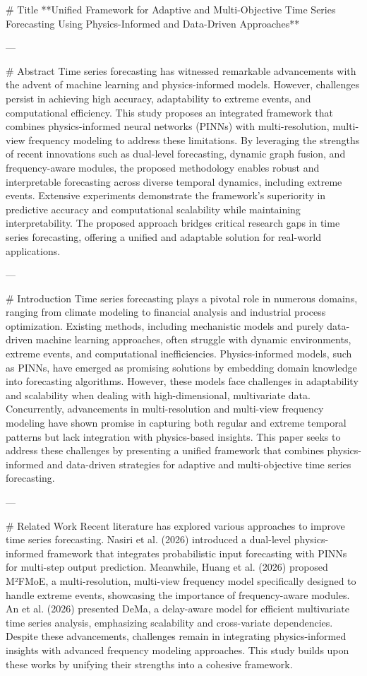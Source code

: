 # Title  
**Unified Framework for Adaptive and Multi-Objective Time Series Forecasting Using Physics-Informed and Data-Driven Approaches**

---

# Abstract  
Time series forecasting has witnessed remarkable advancements with the advent of machine learning and physics-informed models. However, challenges persist in achieving high accuracy, adaptability to extreme events, and computational efficiency. This study proposes an integrated framework that combines physics-informed neural networks (PINNs) with multi-resolution, multi-view frequency modeling to address these limitations. By leveraging the strengths of recent innovations such as dual-level forecasting, dynamic graph fusion, and frequency-aware modules, the proposed methodology enables robust and interpretable forecasting across diverse temporal dynamics, including extreme events. Extensive experiments demonstrate the framework's superiority in predictive accuracy and computational scalability while maintaining interpretability. The proposed approach bridges critical research gaps in time series forecasting, offering a unified and adaptable solution for real-world applications.

---

# Introduction  
Time series forecasting plays a pivotal role in numerous domains, ranging from climate modeling to financial analysis and industrial process optimization. Existing methods, including mechanistic models and purely data-driven machine learning approaches, often struggle with dynamic environments, extreme events, and computational inefficiencies. Physics-informed models, such as PINNs, have emerged as promising solutions by embedding domain knowledge into forecasting algorithms. However, these models face challenges in adaptability and scalability when dealing with high-dimensional, multivariate data. Concurrently, advancements in multi-resolution and multi-view frequency modeling have shown promise in capturing both regular and extreme temporal patterns but lack integration with physics-based insights. This paper seeks to address these challenges by presenting a unified framework that combines physics-informed and data-driven strategies for adaptive and multi-objective time series forecasting.

---

# Related Work  
Recent literature has explored various approaches to improve time series forecasting. Nasiri et al. (2026) introduced a dual-level physics-informed framework that integrates probabilistic input forecasting with PINNs for multi-step output prediction. Meanwhile, Huang et al. (2026) proposed M²FMoE, a multi-resolution, multi-view frequency model specifically designed to handle extreme events, showcasing the importance of frequency-aware modules. An et al. (2026) presented DeMa, a delay-aware model for efficient multivariate time series analysis, emphasizing scalability and cross-variate dependencies. Despite these advancements, challenges remain in integrating physics-informed insights with advanced frequency modeling approaches. This study builds upon these works by unifying their strengths into a cohesive framework.

